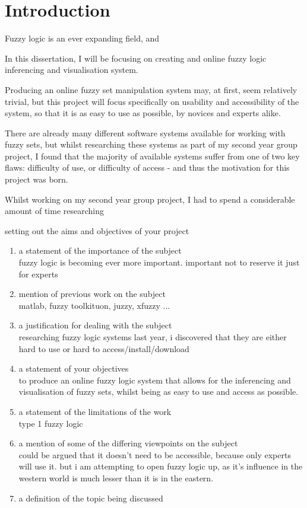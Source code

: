 \section{Introduction}
Fuzzy logic is an ever expanding field, and 

In this dissertation, I will be focusing on creating and online fuzzy logic inferencing and visualisation system. 

Producing an online fuzzy set manipulation system may, at first, seem relatively trivial, but this project will focus specifically on usability and accessibility of the system, so that it is as easy to use as possible, by novices and experts alike. 


There are already many different software systems available for working with fuzzy sets, but whilst researching these systems as part of my second year group project, I found that the majority of available systems suffer from one of two key flaws: difficulty of use, or difficulty of access - and thus the motivation for this project was born. 

Whilst working on my second year group project, I had to spend a considerable amount of time researching 


{\color{red}setting out the aims and objectives of your project
\begin{enumerate}
\item a statement of the importance of the subject\\
fuzzy logic is becoming ever more important. important not to reserve it just for experts
\item mention of previous work on the subject\\
matlab, fuzzy toolkituon, juzzy, xfuzzy ...
\item a justification for dealing with the subject\\
researching fuzzy logic systems last year, i discovered that they are either hard to use or hard to access/install/download
\item a statement of your objectives\\
to produce an online fuzzy logic system that allows for the inferencing and visualisation of fuzzy sets, whilst being as easy to use and access as possible.
\item a statement of the limitations of the work\\
type 1 fuzzy logic
\item a mention of some of the differing viewpoints on the subject\\
could be argued that it doesn't need to be accessible, because only experts will use it. but i am attempting to open fuzzy logic up, as it's influence in the western world is much lesser than it is in the eastern.
\item a definition of the topic being discussed\\

\end{enumerate}
}